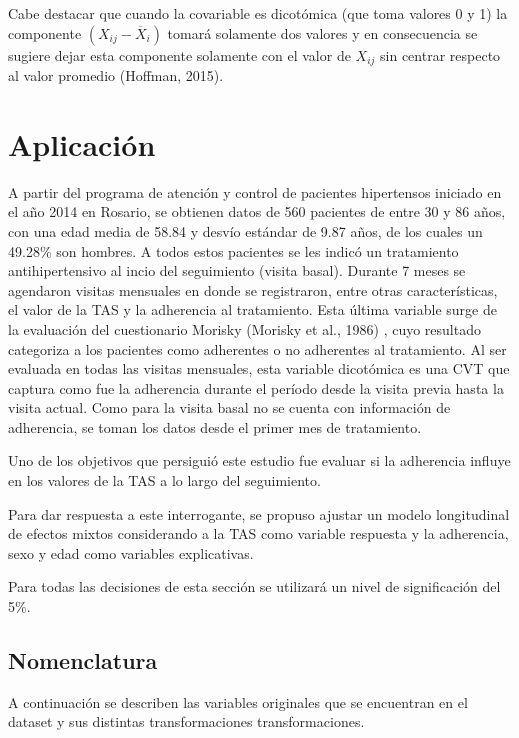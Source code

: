 \documentclass[spanish]{article}
\numberwithin{figure}{subsection}
\numberwithin{equation}{subsection}
\numberwithin{table}{subsection}
\def\npatients{560}
\begin{document}
Cabe destacar que cuando la covariable es dicotómica (que toma valores 0 y 1) la
componente $(X_{ij} - \overline{X}_i)$ tomará solamente dos valores y en
consecuencia se sugiere dejar esta componente solamente con el valor de $X_{ij}$
sin centrar respecto al valor promedio (Hoffman, 2015).

\newpage

\section{Aplicación}

A partir del programa de atención y control de pacientes hipertensos iniciado en
el año 2014 en Rosario, se obtienen datos de \npatients{} pacientes de entre 30
y 86 años, con una edad media de 58.84 y desvío estándar de 9.87 años, de los
cuales un 49.28\% son hombres. A todos estos pacientes se les indicó un
tratamiento antihipertensivo al incio del seguimiento (visita basal). Durante 7
meses se agendaron visitas mensuales en donde se registraron, entre otras
características, el valor de la TAS y la adherencia al tratamiento. Esta última
variable surge de la evaluación del cuestionario Morisky (Morisky et al., 1986)
, cuyo resultado categoriza a los pacientes como adherentes o no adherentes al
tratamiento. Al ser evaluada en todas las visitas mensuales, esta variable
dicotómica es una CVT que captura como fue la adherencia durante el período
desde la visita previa hasta la visita actual. Como para la visita basal no se
cuenta con información de adherencia, se toman los datos desde el primer mes de
tratamiento.

Uno de los objetivos que persiguió este estudio fue evaluar si la adherencia
influye en los valores de la TAS a lo largo del seguimiento.

Para dar respuesta a este interrogante, se propuso ajustar un modelo
longitudinal de efectos mixtos considerando a la TAS como variable respuesta y
la adherencia, sexo y edad como variables explicativas.

Para todas las decisiones de esta sección se utilizará un nivel de significación
del 5\%.

\subsection{Nomenclatura}
\label{variables}

A continuación se describen las variables originales que se encuentran en el
dataset y sus distintas transformaciones transformaciones.
\end{document}
